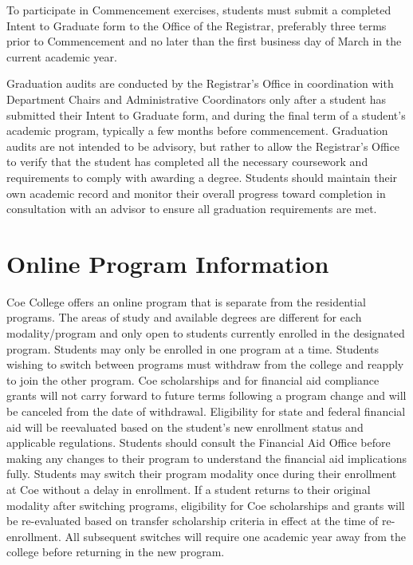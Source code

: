 \documentclass[
  letterpaper,
]{scrbook}
\begin{document}
To participate in Commencement exercises, students must submit a
completed Intent to Graduate form to the Office of the Registrar,
preferably three terms prior to Commencement and no later than the first
business day of March in the current academic year.

Graduation audits are conducted by the Registrar's Office in
coordination with Department Chairs and Administrative Coordinators only
after a student has submitted their Intent to Graduate form, and during
the final term of a student's academic program, typically a few months
before commencement. Graduation audits are not intended to be advisory,
but rather to allow the Registrar's Office to verify that the student
has completed all the necessary coursework and requirements to comply
with awarding a degree. Students should maintain their own academic
record and monitor their overall progress toward completion in
consultation with an advisor to ensure all graduation requirements are
met.

\section{Online Program Information}\label{online-program-information}

Coe College offers an online program that is separate from the
residential programs. The areas of study and available degrees are
different for each modality/program and only open to students currently
enrolled in the designated program. Students may only be enrolled in one
program at a time. Students wishing to switch between programs must
withdraw from the college and reapply to join the other program. Coe
scholarships and for financial aid compliance grants will not carry
forward to future terms following a program change and will be canceled
from the date of withdrawal. Eligibility for state and federal financial
aid will be reevaluated based on the student's new enrollment status and
applicable regulations. Students should consult the Financial Aid Office
before making any changes to their program to understand the financial
aid implications fully. Students may switch their program modality once
during their enrollment at Coe without a delay in enrollment. If a
student returns to their original modality after switching programs,
eligibility for Coe scholarships and grants will be re-evaluated based
on transfer scholarship criteria in effect at the time of re-enrollment.
All subsequent switches will require one academic year away from the
college before returning in the new program.
\end{document}
